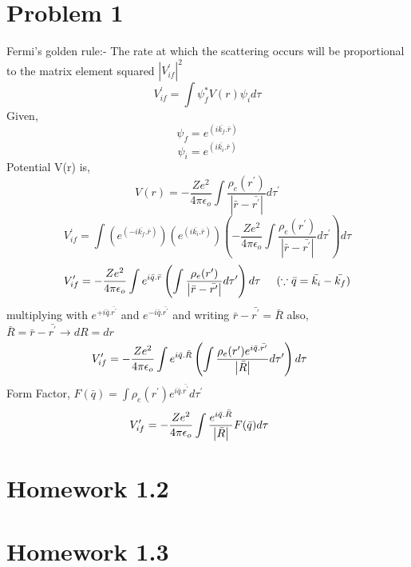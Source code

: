 \documentclass[11pt, a4paper]{article}
\begin{document}
 
    



%
\tableofcontents

\clearpage
    
\section{Problem 1}      
\label{sec:1} 
Fermi's golden rule:- The rate at which the scattering occurs will be proportional to the matrix element squared \(\left\vert V_{if}^\prime  \right\vert^2 \) 
\[
    V_{if} ^\prime  = \int \psi^*_{f} V(r) \psi_{i} d\tau
\]
Given,
\[
    \psi_{f} = e^ {(i \bar{k_f}.\bar{r})}
\]
\[
    \psi_{i} = e^ {(i \bar{k_i}.\bar{r}) }
\]
Potential V(r) is,
\[
    V(r) = -\frac{Ze^2}{4 \pi \epsilon_{o}}\int \frac{\rho_e(r^\prime )}{\left\vert \bar{r}-\bar{r^\prime } \right\vert }d\tau^\prime  
\]
\[
    V_{if} ^\prime = \int   (e^ {(-i \bar{k_f}.\bar{r})})(e^ {(i \bar{k_i}.\bar{r}) })\left(-\frac{Ze^2}{4 \pi \epsilon_{o}}\int \frac{\rho_e(r^\prime )}{\left\vert \bar{r}-\bar{r^\prime } \right\vert }d\tau^\prime\right) d\tau
\]
\[
    V_{if}^\prime = -\frac{Ze^2}{4 \pi \epsilon_{o}} \int e^{i\bar{q}.\bar{r}}\left(\int\frac{\rho_e(r^\prime )}{\left\vert \bar{r}-\bar{r^\prime } \right\vert }d\tau^\prime\right)d\tau \hspace{.5cm} (\because \bar{q} = \bar{k_i}-\bar{k_{f}})
\]
multiplying with \(e^{+i\bar{q}.\bar{r^\prime }}\) and \(e^{-i\bar{q}.\bar{r^\prime }}\) and writing \(\bar{r}-\bar{r^\prime } = \bar{R}\) also, \(\bar{R} = \bar{r}-\bar{r^\prime }  \to  dR = dr\) 
\[
    V_{if}^\prime = -\frac{Ze^2}{4 \pi \epsilon_{o}} \int e^{i\bar{q}.\bar{R}}\left(\int\frac{\rho_e(r^\prime )e^{i \bar{q}.\bar{r^\prime }}}{\left\vert \bar{R} \right\vert }d\tau^\prime\right)d\tau \hspace{.5cm} 
\]
Form Factor, \(F(\bar{q}) = \int \rho_e(r^\prime)e^{i \bar{q}.\bar{r^\prime }}d\tau^\prime\) 
\[
    V_{if}^\prime = -\frac{Ze^2}{4 \pi \epsilon_{o}} \int \frac{e^{i\bar{q}.\bar{R}}}{\left\vert \bar{R} \right\vert}F(\bar{q})d\tau \hspace{.5cm} 
\]



\section{Homework 1.2}
\label{sec:1.2}


\section{Homework 1.3}
\label{sec:1.3}


    
\end{document}
